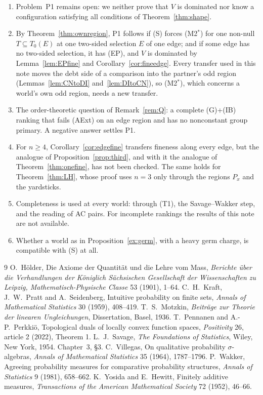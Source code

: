 \documentclass[11pt]{article}
\theoremstyle{definition}\newtheorem{definition}[theorem]{Definition}
\theoremstyle{remark}\newtheorem{remark}[theorem]{Remark}
\begin{document}
\begin{enumerate}[leftmargin=*,itemsep=3pt]
\item Problem~P1 remains open: we neither prove that $V$ is dominated nor
know a configuration satisfying all conditions of Theorem~\ref{thm:shape}.
\item By Theorem~\ref{thm:ownregion}, P1 follows if (S) forces (M2$^*$) for
one non-null $T\subseteq T_0(E)$ at one two-sided selection $E$ of one edge;
and if some edge has no two-sided selection, it has (EP), and $V$ is
dominated by Lemma~\ref{lem:EPfine} and Corollary~\ref{cor:fineedge}. Every
transfer used in this note moves the debt side of a comparison into the
partner's odd region (Lemmas~\ref{lem:CNtoDI} and~\ref{lem:DItoCN}), so
(M2$^*$), which concerns a world's own odd region, needs a new transfer.
\item The order-theoretic question of Remark~\ref{rem:Q}: a complete
(G)+(IB) ranking that fails (AExt) on an edge region and has no nonconstant
group primary. A negative answer settles P1.
\item For $n\ge4$, Corollary~\ref{cor:edgefine} transfers fineness along
every edge, but the analogue of Proposition~\ref{prop:third}, and with it the
analogue of Theorem~\ref{thm:onefine}, has not been checked. The same holds
for Theorem~\ref{thm:LH}, whose proof uses $n=3$ only through the regions
$P_x$ and the yardsticks.
\item Completeness is used at every world: through (T1), the Savage--Wakker
step, and the reading of AC pairs. For incomplete rankings the results of
this note are not available.
\item Whether a world as in Proposition~\ref{ex:germ}, with a heavy germ
charge, is compatible with (S) at all.
\end{enumerate}

\begin{thebibliography}{9}
 O.~H\"older, Die Axiome der Quantit\"at und die Lehre vom
Mass, \emph{Berichte \"uber die Verhandlungen der K\"oniglich
S\"achsischen Gesellschaft der Wissenschaften zu Leipzig,
Mathematisch-Physische Classe} 53 (1901), 1--64.
 C.~H.~Kraft, J.~W.~Pratt and A.~Seidenberg, Intuitive
probability on finite sets, \emph{Annals of Mathematical Statistics} 30
(1959), 408--419.
 T.~S.~Motzkin, \emph{Beitr\"age zur Theorie der linearen
Ungleichungen}, Dissertation, Basel, 1936.
 T.~Pennanen and A.-P.~Perkki\"o, Topological duals of locally
convex function spaces, \emph{Positivity} 26, article 2 (2022), Theorem 1.
 L.~J.~Savage, \emph{The Foundations of Statistics}, Wiley,
New York, 1954. Chapter~3, \S3.
 C.~Villegas, On qualitative probability
$\sigma$-algebras, \emph{Annals of Mathematical Statistics} 35 (1964),
1787--1796.
 P.~Wakker, Agreeing probability measures for comparative
probability structures, \emph{Annals of Statistics} 9 (1981), 658--662.
 K.~Yosida and E.~Hewitt, Finitely additive measures,
\emph{Transactions of the American Mathematical Society} 72 (1952), 46--66.
\end{thebibliography}
\end{document}
